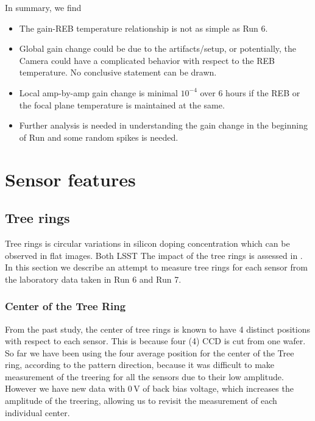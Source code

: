 In summary, we find
\begin{itemize}
    \item The gain-REB temperature relationship is not as simple as Run 6.
    \item Global gain change could be due to the artifacts/setup, or potentially, the Camera could have a complicated behavior with respect to the REB temperature. No conclusive statement can be drawn.
    \item Local amp-by-amp gain change is minimal $10^{-4}$ over 6 hours if the REB or the focal plane temperature is maintained at the same.
    \item Further analysis is needed in understanding the gain change in the beginning of Run and some random spikes is needed.
\end{itemize}

\section{Sensor features}\label{sensor-features}

\subsection{Tree rings}\label{tree-rings}
Tree rings is circular variations in silicon doping concentration which can be observed in flat images. Both LSST The impact of the tree rings is assessed in \citep{2017Jinst..12C05015, 10.1117/1.JATIS.6.1.011005, 2023PASP..135k5003E}. In this section we describe an attempt to measure tree rings for each sensor from the laboratory data taken in Run 6 and Run 7.
\subsubsection{Center of the Tree Ring}
From the past study, the center of tree rings is known to have 4 distinct positions with respect to each sensor. This is because four (4) CCD is cut from one wafer. 
So far we have been using the four average position for the center of the Tree ring, according to the pattern direction, because it was difficult to make measurement of the treering for all the sensors due to their low amplitude. However we have new data with 0\,V of back bias voltage, which increases the amplitude of the treering, allowing us to revisit the measurement of each individual center.

